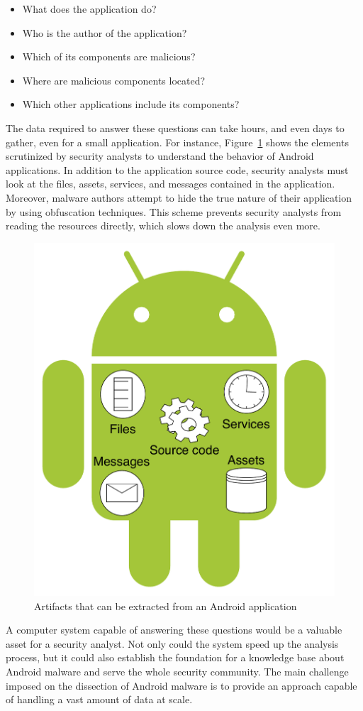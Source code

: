 \begin{itemize}
	\item What does the application do?
	\item Who is the author of the application?
	\item Which of its components are malicious?
	\item Where are malicious components located?
	\item Which other applications include its components?
\end{itemize}

The data required to answer these questions can take hours, and even days to gather, even for a small application.
For instance, Figure~\ref{figure:introduction:dissection} shows the elements scrutinized by security analysts to understand the behavior of Android applications.
In addition to the application source code, security analysts must look at the files, assets, services, and messages contained in the application.
Moreover, malware authors attempt to hide the true nature of their application by using obfuscation techniques.
This scheme prevents security analysts from reading the resources directly, which slows down the analysis even more.

\begin{figure}[!ht]
	\centering
	\includegraphics[width=0.45\linewidth]{figures/introduction/dissection.pdf}
	\caption{Artifacts that can be extracted from an Android application}
	\label{figure:introduction:dissection}
\end{figure}

A computer system capable of answering these questions would be a valuable asset for a security analyst.
Not only could the system speed up the analysis process, but it could also establish the foundation for a knowledge base about Android malware and serve the whole security community.
The main challenge imposed on the dissection of Android malware is to provide an approach capable of handling a vast amount of data at scale.
